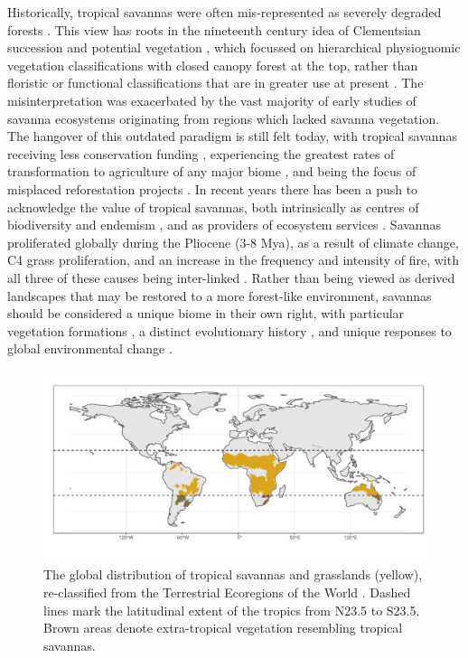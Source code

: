 \begin{refsection}
Historically, tropical savannas were often mis-represented as severely degraded forests \citep{Veldman2016}. This view has roots in the nineteenth century idea of Clementsian succession and potential vegetation \citep{Pulsford2014}, which focussed on hierarchical physiognomic vegetation classifications with closed canopy forest at the top, rather than floristic or functional classifications that are in greater use at present \citep{Aleman2020}. The misinterpretation was exacerbated by the vast majority of early studies of savanna ecosystems originating from regions which lacked savanna vegetation. The hangover of this outdated paradigm is still felt today, with tropical savannas receiving less conservation funding \citep{Watson2016}, experiencing the greatest rates of transformation to agriculture of any major biome \citep{Hoekstra2004, Parr2014}, and being the focus of misplaced reforestation projects \citep{Silveira2020, Kumar2020, Laestadius2011}. In recent years there has been a push to acknowledge the value of tropical savannas, both intrinsically as centres of biodiversity and endemism \citep{Kumar2020, Pennington2018}, and as providers of ecosystem services \citep{Ryan2016}. Savannas proliferated globally during the Pliocene (\textapprox{}3-8 Mya), as a result of climate change, C4 grass proliferation, and an increase in the frequency and intensity of fire, with all three of these causes being inter-linked \citep{Cerling1997, Beerling2006, Edwards2010}. Rather than being viewed as derived landscapes that may be restored to a more forest-like environment, savannas should be considered a unique biome in their own right, with particular vegetation formations \citep{Torello2013}, a distinct evolutionary history \citep{Veldman2015}, and unique responses to global environmental change \citep{}.

\begin{figure}[tb]
\centering
	\includegraphics[width=\textwidth]{img/savanna_map}
	\caption[Map of global savanna distribution]{The global distribution of tropical savannas and grasslands (yellow), re-classified from the Terrestrial Ecoregions of the World \citep{Dinerstein2017}. Dashed lines mark the latitudinal extent of the tropics from N23.5\textdegree{} to S23.5\textdegree{}. Brown areas denote extra-tropical vegetation resembling tropical savannas.}
	\label{background:savanna_map}
\end{figure}


\end{refsection}
